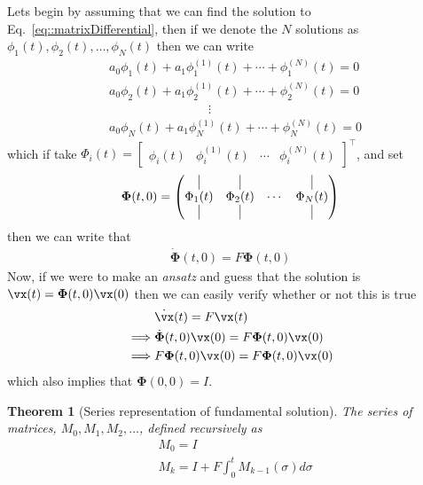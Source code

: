 \documentclass[a4paper,11pt]{exam}
\newtheorem{theorem}{Theorem}
\newcommand{\fundamentalSolution}{\boldsymbol{\Phi}}
\begin{document}
\begin{questions}
Lets begin by assuming that we can find the solution to Eq.~\eqref{eq::matrixDifferential}, then if we denote the $N$ solutions as $\phi_1(t), \phi_2(t), \ldots, \phi_N(t)$ then we can write
\begin{align}
    &a_0 \phi_1(t) + a_1 \phi_1^{(1)}(t) + \cdots + \phi_1^{(N)}(t) = 0\\
    &a_0 \phi_2(t) + a_1 \phi_2^{(1)}(t) + \cdots + \phi_2^{(N)}(t) = 0\\
    & \qquad \qquad \qquad \qquad \vdots\\
    &a_0 \phi_N(t) + a_1 \phi_N^{(1)}(t) + \cdots + \phi_N^{(N)}(t) = 0
\end{align}
which if take $\Phi_i(t) = \begin{bmatrix} \phi_i(t) & \phi_i^{(1)}(t) & \cdots & \phi_i^{(N)}(t) \end{bmatrix}^\top$, and set 
\begin{align}
    \fundamentalSolution(t, 0) = \begin{pmatrix} \vline & \vline & & \vline\\
        \Phi_1(t) & \Phi_2(t) & \cdots & \Phi_N(t)\\
        \vline & \vline & & \vline
    \end{pmatrix}
\end{align}
then we can write that
\begin{align}
    \dot{\fundamentalSolution}(t, 0) = F \fundamentalSolution(t, 0)
\end{align}
Now, if we were to make an \textit{ansatz} and guess that the solution is $\vx(t) = \fundamentalSolution(t, 0) \vx(0)$ then we can easily verify whether or not this is true
\begin{align}
    &\dot{\vx}(t) = F \vx(t)\\
    \implies & \dot{\fundamentalSolution}(t, 0) \vx(0) = F \fundamentalSolution(t, 0) \vx(0)\\
    \implies & F \fundamentalSolution(t, 0) \vx(0) = F \fundamentalSolution(t, 0) \vx(0)
\end{align}
which also implies that $\fundamentalSolution(0, 0) = I$.  
\begin{tcolorbox}[colback=black!1!,title=Fundamental Solution]
    \begin{theorem}[Series representation of fundamental solution]
        The series of matrices, $M_0, M_1, M_2, \ldots$, defined recursively as
        \begin{align}
            &M_0 = I\\
            &M_k = I + F \int_0^t M_{k-1}(\sigma) d\sigma

\end{align}
\end{theorem}
\end{tcolorbox}
\end{questions}
\end{document}
